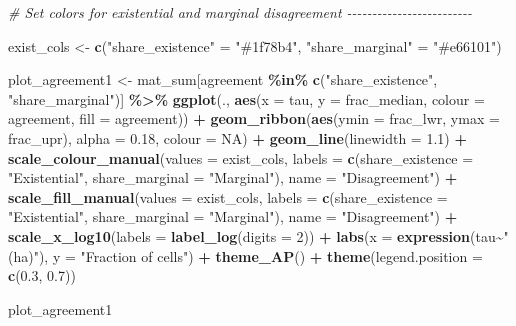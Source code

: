 \documentclass[
  11pt,
]{article}
\newenvironment{Shaded}{\begin{snugshade}}{\end{snugshade}}
\newcommand{\AttributeTok}[1]{\textcolor[rgb]{0.13,0.29,0.53}{#1}}
\newcommand{\CommentTok}[1]{\textcolor[rgb]{0.56,0.35,0.01}{\textit{#1}}}
\newcommand{\ConstantTok}[1]{\textcolor[rgb]{0.56,0.35,0.01}{#1}}
\newcommand{\DecValTok}[1]{\textcolor[rgb]{0.00,0.00,0.81}{#1}}
\newcommand{\FloatTok}[1]{\textcolor[rgb]{0.00,0.00,0.81}{#1}}
\newcommand{\FunctionTok}[1]{\textcolor[rgb]{0.13,0.29,0.53}{\textbf{#1}}}
\newcommand{\NormalTok}[1]{#1}
\newcommand{\OtherTok}[1]{\textcolor[rgb]{0.56,0.35,0.01}{#1}}
\newcommand{\SpecialCharTok}[1]{\textcolor[rgb]{0.81,0.36,0.00}{\textbf{#1}}}
\newcommand{\StringTok}[1]{\textcolor[rgb]{0.31,0.60,0.02}{#1}}
\begin{document}
\begin{Shaded}
\begin{Highlighting}[]
\CommentTok{\# Set colors for existential and marginal disagreement {-}{-}{-}{-}{-}{-}{-}{-}{-}{-}{-}{-}{-}{-}{-}{-}{-}{-}{-}{-}{-}{-}{-}{-}{-}}

\NormalTok{exist\_cols }\OtherTok{\textless{}{-}} \FunctionTok{c}\NormalTok{(}\StringTok{"share\_existence"} \OtherTok{=} \StringTok{"\#1f78b4"}\NormalTok{, }\StringTok{"share\_marginal"} \OtherTok{=} \StringTok{"\#e66101"}\NormalTok{)}

\NormalTok{plot\_agreement1 }\OtherTok{\textless{}{-}}\NormalTok{ mat\_sum[agreement }\SpecialCharTok{\%in\%} \FunctionTok{c}\NormalTok{(}\StringTok{"share\_existence"}\NormalTok{, }\StringTok{"share\_marginal"}\NormalTok{)] }\SpecialCharTok{\%\textgreater{}\%}
  \FunctionTok{ggplot}\NormalTok{(., }\FunctionTok{aes}\NormalTok{(}\AttributeTok{x =}\NormalTok{ tau, }\AttributeTok{y =}\NormalTok{ frac\_median, }\AttributeTok{colour =}\NormalTok{ agreement, }\AttributeTok{fill =}\NormalTok{ agreement)) }\SpecialCharTok{+}
  \FunctionTok{geom\_ribbon}\NormalTok{(}\FunctionTok{aes}\NormalTok{(}\AttributeTok{ymin =}\NormalTok{ frac\_lwr, }\AttributeTok{ymax =}\NormalTok{ frac\_upr), }\AttributeTok{alpha =} \FloatTok{0.18}\NormalTok{, }\AttributeTok{colour =} \ConstantTok{NA}\NormalTok{) }\SpecialCharTok{+}
  \FunctionTok{geom\_line}\NormalTok{(}\AttributeTok{linewidth =} \FloatTok{1.1}\NormalTok{) }\SpecialCharTok{+}
  \FunctionTok{scale\_colour\_manual}\NormalTok{(}\AttributeTok{values =}\NormalTok{ exist\_cols,}
                      \AttributeTok{labels =} \FunctionTok{c}\NormalTok{(}\AttributeTok{share\_existence =} \StringTok{"Existential"}\NormalTok{,}
                                 \AttributeTok{share\_marginal =} \StringTok{"Marginal"}\NormalTok{),}
                      \AttributeTok{name =} \StringTok{"Disagreement"}\NormalTok{) }\SpecialCharTok{+}
  \FunctionTok{scale\_fill\_manual}\NormalTok{(}\AttributeTok{values =}\NormalTok{ exist\_cols,}
                    \AttributeTok{labels =} \FunctionTok{c}\NormalTok{(}\AttributeTok{share\_existence =} \StringTok{"Existential"}\NormalTok{,}
                               \AttributeTok{share\_marginal =} \StringTok{"Marginal"}\NormalTok{),}
                    \AttributeTok{name =} \StringTok{"Disagreement"}\NormalTok{) }\SpecialCharTok{+}
  \FunctionTok{scale\_x\_log10}\NormalTok{(}\AttributeTok{labels =} \FunctionTok{label\_log}\NormalTok{(}\AttributeTok{digits =} \DecValTok{2}\NormalTok{)) }\SpecialCharTok{+}
  \FunctionTok{labs}\NormalTok{(}\AttributeTok{x =} \FunctionTok{expression}\NormalTok{(tau}\SpecialCharTok{\textasciitilde{}}\StringTok{"(ha)"}\NormalTok{), }\AttributeTok{y =} \StringTok{"Fraction of cells"}\NormalTok{) }\SpecialCharTok{+}
  \FunctionTok{theme\_AP}\NormalTok{() }\SpecialCharTok{+}
  \FunctionTok{theme}\NormalTok{(}\AttributeTok{legend.position =} \FunctionTok{c}\NormalTok{(}\FloatTok{0.3}\NormalTok{, }\FloatTok{0.7}\NormalTok{))}


\NormalTok{plot\_agreement1}
\end{Highlighting}
\end{Shaded}
\end{document}
